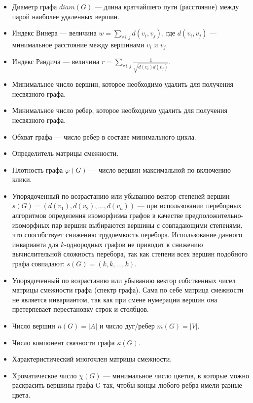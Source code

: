 \begin{itemize}
\item Диаметр графа  $diam(G)$ --- длина кратчайшего пути (расстояние) между парой наиболее удаленных вершин.
\item Индекс Винера — величина  $w=\sum _{{\forall i,j}}d(v_{i},v_{j})$, где  $d(v_{i},v_{j})$ — минимальное расстояние между вершинами  $v_{i}$ и  $v_{j}$.
\item Индекс Рандича — величина  $r=\sum _{{\forall i,j}}{\frac  {1}{{\sqrt  {d(v_{i})d(v_{j})}}}}$.
\item Минимальное число вершин, которое необходимо удалить для получения несвязного графа.
\item Минимальное число ребер, которое необходимо удалить для получения несвязного графа.
\item Обхват графа — число ребер в составе минимального цикла.
\item Определитель матрицы смежности.
\item Плотность графа  $\varphi (G)$ --- число вершин максимальной по включению клики.
\item Упорядоченный по возрастанию или убыванию вектор степеней вершин  $s(G)=(d(v_{1}),d(v_{2}),\dots ,d(v_{n}))$ --- при
использовании переборных алгоритмов определения изоморфизма графов в качестве
предположительно-изоморфных пар вершин выбираются вершины с совпадающими степенями,
что способствует снижению трудоемкость перебора. Использование данного инварианта для
$k$-однородных графов не приводит к снижению вычислительной сложность перебора, так как
степени всех вершин подобного графа совпадают:  $s(G)=(k,k,\dots ,k)$.
\item Упорядоченный по возрастанию или убыванию вектор собственных чисел матрицы смежности графа (спектр графа). Сама по себе матрица смежности не является инвариантом, так как при смене нумерации вершин она претерпевает перестановку строк и столбцов.
\item Число вершин  $n(G)=|A|$ и число дуг/ребер  $m(G)=|V|$.
\item Число компонент связности графа  $\kappa (G)$.
\item Характеристический многочлен матрицы смежности.
\item Хроматическое число  $\chi (G)$ --- минимальное число цветов, в которые можно
раскрасить вершины графа G так, чтобы концы любого ребра имели разные цвета.
\end{itemize}
